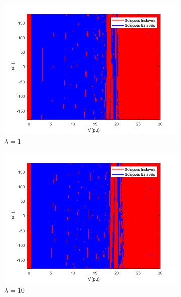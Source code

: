 \clearpage
\begin{figure}[H]
    \centering
    \caption{Mapa Fractal FPMO - IEEE 14 Barras}
    \begin{subfigure}[b]{0.45\textwidth}
        \centering
        \includegraphics[width=\textwidth]{textuais/capitulo4/figuras/FPOM_nom.png}
        \caption{$\lambda=1$}
    \end{subfigure}
    \vfill
    \begin{subfigure}[b]{0.45\textwidth}
        \centering
        \includegraphics[width=\textwidth]{textuais/capitulo4/figuras/FPOM_10LAMBDA.png}
        \caption{$\lambda=10$}
    \end{subfigure}
    \vfill
    \begin{subfigure}[b]{0.45\textwidth}

\end{subfigure}
\end{figure}

